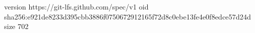 version https://git-lfs.github.com/spec/v1
oid sha256:e921de8233d395cbb3886f0750672912165f72d8c0ebe13fe4e0f8edce57d24d
size 702
